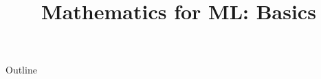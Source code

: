 \documentclass[xcolor=dvipsnames,compress,t,pdf,9pt]{beamer}
\title[\insertframenumber /\inserttotalframenumber]{Mathematics for ML: Basics}
\begin{document}
	\begin{frame}
	\titlepage
	\end{frame}

	\begin{frame}{Outline}
	    \tableofcontents
	\end{frame}

	
	
	
	
\end{document}
